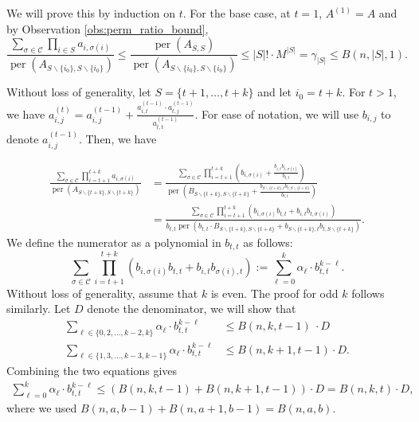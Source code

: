 \documentclass[11pt]{article}
\makeatletter
\theoremstyle{definition}
\newenvironment{proof}[1][\protect\proofname]{\par
	\normalfont\topsep6\p@\@plus6\p@\relax
	\trivlist
	\itemindent\parindent        %
	\item[\hskip\labelsep\scshape #1]\ignorespaces
}{%
	\endtrivlist\@endpefalse
}
\providecommand{\proofname}{Proof}
\DeclareMathOperator{\per}{per}
\makeatother
\begin{document}
\begin{proof}
    We will prove this by induction on $t$. For the base case, at $t = 1$, $A^{(1)} = A$ and by Observation \ref{obs:perm_ratio_bound},
    \begin{equation*}
          \frac{\sum_{\sigma \in \mathcal{C}} \prod_{i \in S} a_{i, \sigma(i)}}{\per(A_{S\backslash \{i_0\}, S \backslash \{i_0\}})} \leq \frac{\per(A_{S, S})}{\per(A_{S\backslash \{i_0\}, S \backslash \{i_0\}})} \leq |S|! \cdot M^{|S|} = \gamma_{|S|}\leq B(n,|S|,1).
    \end{equation*}

Without loss of generality, let $S=\{t+1, \ldots, t+k\}$ and let $i_0 = t+k$. 
    For $t > 1$, we have $a^{(t)}_{i,j} = a^{(t-1)}_{i,j} + \frac{a^{(t-1)}_{i,t} \cdot a^{(t-1)}_{t,j}}{a^{(t-1)}_{t,t}}$. 
    For ease of notation, we will use $b_{i,j}$ to denote $a^{(t-1)}_{i,j}$.  Then, we have

    \begin{align*}
        \frac{\sum_{\sigma \in \mathcal{C}} \prod_{i = t+1}^{t+k} a_{i, \sigma(i)}}{\per(A_{S\backslash \{t+k\}, S \backslash \{t+k\}})} &=  \frac{\sum_{\sigma \in \mathcal{C}} \prod_{i = t+1}^{t+k} \left(b_{i, \sigma(i)} + \frac{b_{i,t} b_{t,\sigma(i)}}{b_{t,t}}\right)}{\per\left(B_{S\backslash \{t+k\}, S \backslash \{t+k\}} + \frac{b_{S\backslash \{t+k\}, t} b_{t, S\backslash \{t+k\}}}{b_{t,t}}\right)} \\
        &= \frac{\sum_{\sigma \in \mathcal{C}} \prod_{i = t+1}^{t+k} \left(b_{i, \sigma(i)} b_{t,t} + b_{i,t} b_{t,\sigma(i)}\right)}{b_{t,t} \per\left(b_{t,t} \cdot B_{S\backslash \{t+k\}, S \backslash \{t+k\}} +b_{S\backslash \{t+k\}, t} b_{t, S\backslash \{t+k\}}\right)}.
    \end{align*}
    We define the numerator as a polynomial in $b_{t,t}$ as follows:
    \begin{equation*}
        \sum_{\sigma \in \mathcal{C}} \prod_{i = t+1}^{t+k} \left(b_{i, \sigma(i)} b_{t,t} + b_{i,t} b_{\sigma(i), t}\right) := \sum_{\ell = 0}^{k} \alpha_{\ell} \cdot b_{t,t}^{k-\ell}.
    \end{equation*}
    Without loss of generality, assume that $k$ is even. The proof for odd $k$ follows similarly. Let $D$ denote the denominator, we will show that 
    \begin{align*}
        \sum_{\ell \in \{0, 2, \ldots, k-2, k\}} \alpha_{\ell} \cdot b_{t,t}^{k-\ell} &\leq B(n, k, t-1) \ \cdot D \\
        \sum_{\ell \in \{1, 3, \ldots, k-3, k-1\} } \alpha_{\ell} \cdot b_{t,t}^{k-\ell} &\leq B(n, k+1, t-1) \cdot D.
    \end{align*}
    Combining the two equations gives
    \begin{align*}
        \sum_{\ell = 0}^{k} \alpha_{\ell} \cdot b_{t,t}^{k-\ell} \leq \left( B(n, k, t-1) + B(n, k+1, t-1)\right) \cdot D = B(n, k, t)  \cdot D,
    \end{align*}
where we used $B(n, a, b-1) + B(n, a+1, b-1) = B(n, a, b)$.


\end{proof}
\end{document}
